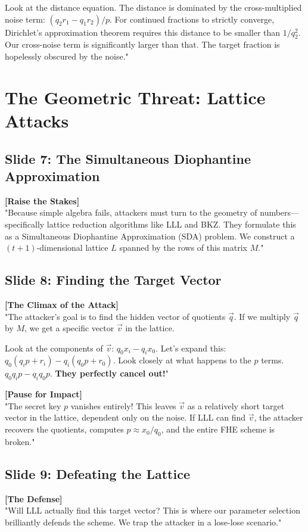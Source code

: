 \documentclass[11pt]{article}
\begin{document}
Look at the distance equation. The distance is dominated by the cross-multiplied noise term: $(q_2 r_1 - q_1 r_2) / p$. For continued fractions to strictly converge, Dirichlet's approximation theorem requires this distance to be smaller than $1/q_2^2$. Our cross-noise term is significantly larger than that. The target fraction is hopelessly obscured by the noise."

\section{The Geometric Threat: Lattice Attacks}

\subsection*{Slide 7: The Simultaneous Diophantine Approximation}
\textbf{[Raise the Stakes]} \\
"Because simple algebra fails, attackers must turn to the geometry of numbers---specifically lattice reduction algorithms like LLL and BKZ. They formulate this as a Simultaneous Diophantine Approximation (SDA) problem. We construct a $(t+1)$-dimensional lattice $L$ spanned by the rows of this matrix $M$."

\subsection*{Slide 8: Finding the Target Vector}
\textbf{[The Climax of the Attack]} \\
"The attacker's goal is to find the hidden vector of quotients $\vec{q}$. If we multiply $\vec{q}$ by $M$, we get a specific vector $\vec{v}$ in the lattice. 

Look at the components of $\vec{v}$: $q_0 x_i - q_i x_0$. 
Let's expand this: $q_0(q_i p + r_i) - q_i(q_0 p + r_0)$.
Look closely at what happens to the $p$ terms. $q_0 q_i p - q_i q_0 p$. \textbf{They perfectly cancel out!}"

\textbf{[Pause for Impact]} \\
"The secret key $p$ vanishes entirely! This leaves $\vec{v}$ as a relatively short target vector in the lattice, dependent only on the noise. If LLL can find $\vec{v}$, the attacker recovers the quotients, computes $p \approx x_0 / q_0$, and the entire FHE scheme is broken."

\subsection*{Slide 9: Defeating the Lattice}
\textbf{[The Defense]} \\
"Will LLL actually find this target vector? This is where our parameter selection brilliantly defends the scheme. We trap the attacker in a lose-lose scenario."
\end{document}
